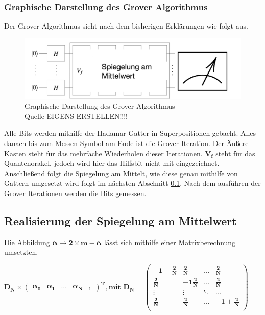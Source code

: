 \subsubsection{Graphische Darstellung des Grover Algorithmus}
Der Grover Algorithmus sieht nach dem bisherigen Erklärungen wie folgt aus.
\begin{figure}[hbtp]
	\centering
	\includegraphics[width=1\textwidth]{figures/algotInformell.png}
	\caption{Graphische Darstellung des Grover Algorithmus \\ Quelle EIGENS ERSTELLEN!!!! }
	\label{fig:algotInformellt}
\end{figure}
Alle Bits werden mithilfe der Hadamar Gatter in Superpositionen gebacht. Alles danach bis zum Messen Symbol am Ende ist die Grover Iteration.
Der Äußere Kasten steht für das mehrfache Wiederholen dieser Iterationen. $\mathbf{V_f}$ steht für das Quantenorakel, jedoch wird hier das Hilfsbit nicht mit eingezeichnet.  Anschließend folgt die Spiegelung am Mittelt, wie diese genau mithilfe von Gattern umgesetzt wird folgt im nächsten Abschnitt \ref{sec:realiserung}. Nach dem ausführen der Grover Iterationen werden die Bits gemessen.
\subsection{Realisierung der Spiegelung am Mittelwert}
\label{sec:realiserung}
Die Abbildung $\mathbf{\alpha \rightarrow 2 \times m - \alpha}$ lässt sich mithilfe einer Matrixberechnung umsetzten.
\begin{center}
	$\mathbf{D_N \times 
	\begin{pmatrix}
			\alpha_0 & \alpha_1 & \dots &\alpha_{N-1}
	\end{pmatrix}^T, \text{mit } D_N = 
	\begin{pmatrix}
			-1 + \frac{2}{N} & \frac{2}{N} & \dots& \frac{2}{N} \\
			\frac{2}{N} & -1 \frac{2}{N} & \dots& \frac{2}{N} \\
			\vdots & \vdots & \ddots& \dots \\
			 \frac{2}{N} & \frac{2}{N} & \dots& -1+ \frac{2}{N} \\
	\end{pmatrix}}$
\end{center}
